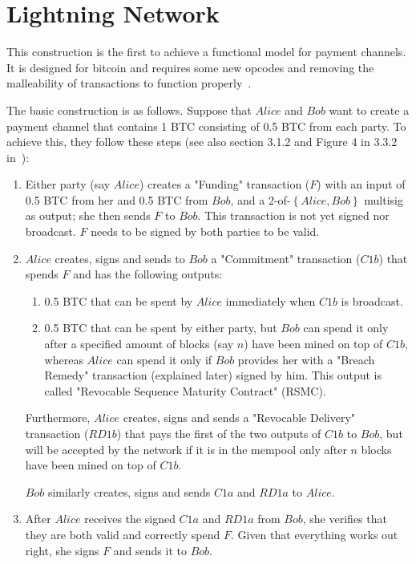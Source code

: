 \section{Lightning Network}
  This construction is the first to achieve a functional model for payment channels. It
  is designed for bitcoin and requires some new opcodes and removing the malleability of
  transactions to function properly~\cite{lightning}.

  The basic construction is as follows. Suppose that $Alice$ and $Bob$ want to create a
  payment channel that contains 1 BTC consisting of 0.5 BTC from each party. To achieve
  this, they follow these steps (see also section 3.1.2 and Figure 4 in 3.3.2
  in~\cite{lightning}):
  \begin{enumerate}
    \item Either party (say $Alice$) creates a "Funding" transaction ($F$) with an input
    of 0.5 BTC from her and 0.5 BTC from $Bob$, and a 2-of-$\left\{Alice, Bob\right\}$
    multisig as output; she then sends $F$ to $Bob$. This transaction is not yet signed
    nor broadcast. $F$ needs to be signed by both parties to be valid.

    \item $Alice$ creates, signs and sends to $Bob$ a "Commitment" transaction ($C1b$)
    that spends $F$ and has the following outputs:
    \begin{enumerate}
      \item 0.5 BTC that can be spent by $Alice$ immediately when $C1b$ is broadcast.
      \item 0.5 BTC that can be spent by either party, but $Bob$ can spend it only after
      a specified amount of blocks (say $n$) have been mined on top of $C1b$, whereas
      $Alice$ can spend it only if $Bob$ provides her with a "Breach Remedy" transaction
      (explained later) signed by him. This output is called "Revocable Sequence Maturity
      Contract" (RSMC).
    \end{enumerate}
    Furthermore, $Alice$ creates, signs and sends a "Revocable Delivery" transaction
    ($RD1b$) that pays the first of the two outputs of $C1b$ to $Bob$, but will be
    accepted by the network if it is in the mempool only after $n$ blocks have been mined
    on top of $C1b$.

    $Bob$ similarly creates, signs and sends $C1a$ and $RD1a$ to $Alice$.

    \item After $Alice$ receives the signed $C1a$ and $RD1a$ from $Bob$, she verifies that
    they are both valid and correctly spend $F$. Given that everything works out right,
    she signs $F$ and sends it to $Bob$.


\end{enumerate}
